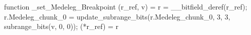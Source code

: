 function _set_Medeleg_Breakpoint (r_ref, v) = {
    r = __bitfield_deref(r_ref);
    r.Medeleg_chunk_0 = update_subrange_bits(r.Medeleg_chunk_0, 3, 3, subrange_bits(v, 0, 0));
    (*r_ref) = r
}
